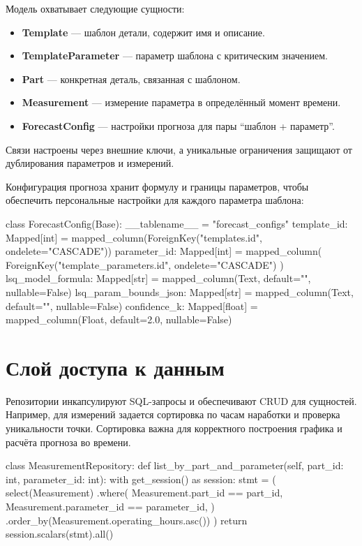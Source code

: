 \documentclass[12pt,a4paper]{article}
\begin{document}
Модель охватывает следующие сущности:
\begin{itemize}
  \item \textbf{Template} --- шаблон детали, содержит имя и описание.
  \item \textbf{TemplateParameter} --- параметр шаблона с критическим значением.
  \item \textbf{Part} --- конкретная деталь, связанная с шаблоном.
  \item \textbf{Measurement} --- измерение параметра в определённый момент времени.
  \item \textbf{ForecastConfig} --- настройки прогноза для пары ``шаблон + параметр''.
\end{itemize}
Связи настроены через внешние ключи, а уникальные ограничения защищают от
дублирования параметров и измерений.

Конфигурация прогноза хранит формулу и границы параметров, чтобы обеспечить
персональные настройки для каждого параметра шаблона:
\begin{codeblock}
class ForecastConfig(Base):
    __tablename__ = "forecast_configs"
    template_id: Mapped[int] = mapped_column(ForeignKey("templates.id", ondelete="CASCADE"))
    parameter_id: Mapped[int] = mapped_column(
        ForeignKey("template_parameters.id", ondelete="CASCADE")
    )
    lsq_model_formula: Mapped[str] = mapped_column(Text, default="", nullable=False)
    lsq_param_bounds_json: Mapped[str] = mapped_column(Text, default="{}", nullable=False)
    confidence_k: Mapped[float] = mapped_column(Float, default=2.0, nullable=False)
\end{codeblock}

\section*{Слой доступа к данным}
Репозитории инкапсулируют SQL-запросы и обеспечивают CRUD для сущностей. Например,
для измерений задается сортировка по часам наработки и проверка уникальности точки.
Сортировка важна для корректного построения графика и расчёта прогноза во времени.
\begin{codeblock}
class MeasurementRepository:
    def list_by_part_and_parameter(self, part_id: int, parameter_id: int):
        with get_session() as session:
            stmt = (
                select(Measurement)
                .where(
                    Measurement.part_id == part_id,
                    Measurement.parameter_id == parameter_id,
                )
                .order_by(Measurement.operating_hours.asc())
            )
            return session.scalars(stmt).all()
\end{codeblock}
\end{document}
